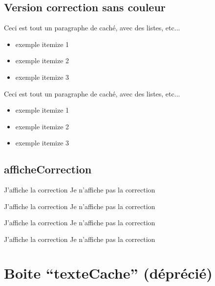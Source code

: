 \documentclass[a4paper,12pt]{article}
\begin{document}
	\subsection{Version correction sans couleur}

\begin{code}
\noColorCorrection
\begin{bigReponse}
	Ceci est tout un paragraphe de caché,
	avec des listes, etc...
	\begin{itemize}
		\item exemple itemize 1
		\item exemple itemize 2
		\item exemple itemize 3
	\end{itemize}
\end{bigReponse}
\end{code}


\noColorCorrection
\begin{bigReponse}
	Ceci est tout un paragraphe de caché,
	avec des listes, etc...
	\begin{itemize}
		\item exemple itemize 1
		\item exemple itemize 2
		\item exemple itemize 3
	\end{itemize}
\end{bigReponse}



	\subsection{afficheCorrection}

\begin{code}
	{J'affiche la correction}
	{Je n'affiche pas la correction}
	
	{J'affiche la correction}
	{Je n'affiche pas la correction}
\end{code}

	{J'affiche la correction}
	{Je n'affiche pas la correction}
	
	{J'affiche la correction}
	{Je n'affiche pas la correction}




	\section{Boite ``texteCache'' (déprécié)}
\end{document}
